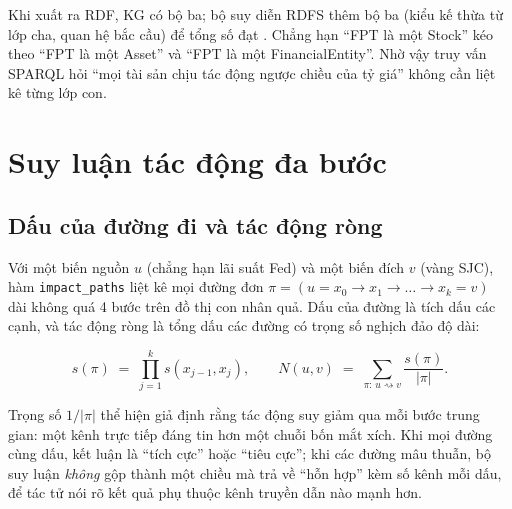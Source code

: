 


Khi xuất ra RDF, KG có  bộ ba; bộ suy diễn RDFS thêm  bộ ba
(kiểu kế thừa từ lớp cha, quan hệ bắc cầu) để tổng số đạt . Chẳng hạn ``FPT là một
\textsf{Stock}'' kéo theo ``FPT là một \textsf{Asset}'' và ``FPT là một \textsf{FinancialEntity}''. Nhờ vậy truy vấn SPARQL hỏi ``mọi tài sản chịu tác động ngược chiều của tỷ giá'' không
cần liệt kê từng lớp con.

\section{Suy luận tác động đa bước}\label{sec:multihop}
\subsection{Dấu của đường đi và tác động ròng}
Với một biến nguồn $u$ (chẳng hạn lãi suất Fed) và một biến đích $v$ (vàng SJC), hàm \texttt{impact\_paths} liệt kê
mọi đường đơn $\pi = (u = x_0 \to x_1 \to \dots \to x_k = v)$ dài không quá 4 bước trên đồ thị con nhân quả. Dấu của
đường là tích dấu các cạnh, và tác động ròng là tổng dấu các đường có trọng số nghịch đảo độ dài:

\begin{equation}\label{eq:rong}
  s(\pi) \;=\; \prod_{j=1}^{k} s(x_{j-1}, x_j), \qquad
  N(u, v) \;=\; \sum_{\pi:\, u \rightsquigarrow v} \frac{s(\pi)}{|\pi|}.
\end{equation}

Trọng số $1/|\pi|$ thể hiện giả định rằng tác động suy giảm qua mỗi bước trung gian: một kênh trực tiếp đáng tin hơn
một chuỗi bốn mắt xích. Khi mọi đường cùng dấu, kết luận là ``tích cực'' hoặc ``tiêu cực''; khi các đường mâu thuẫn,
bộ suy luận \emph{không} gộp thành một chiều mà trả về ``hỗn hợp'' kèm số kênh mỗi dấu, để tác tử nói rõ kết quả phụ
thuộc kênh truyền dẫn nào mạnh hơn.


